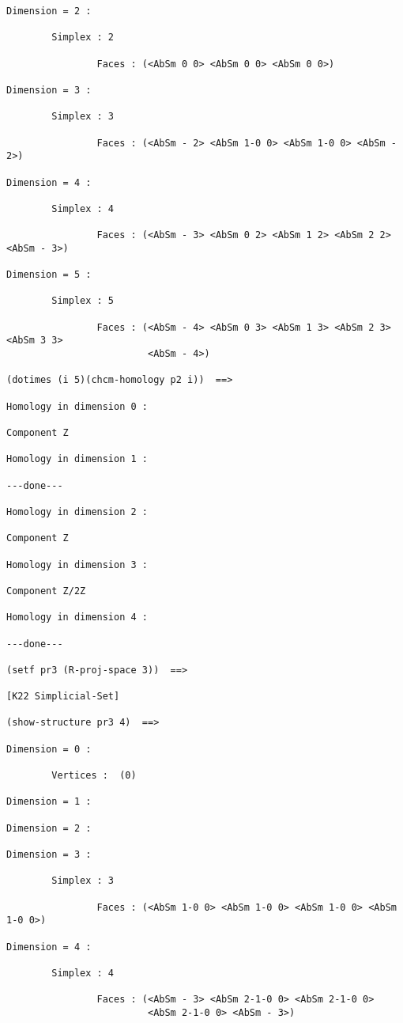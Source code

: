 {{\begin{verbatim}
Dimension = 2 :

        Simplex : 2

                Faces : (<AbSm 0 0> <AbSm 0 0> <AbSm 0 0>)

Dimension = 3 :

        Simplex : 3

                Faces : (<AbSm - 2> <AbSm 1-0 0> <AbSm 1-0 0> <AbSm - 2>)

Dimension = 4 :

        Simplex : 4

                Faces : (<AbSm - 3> <AbSm 0 2> <AbSm 1 2> <AbSm 2 2> <AbSm - 3>)

Dimension = 5 :

        Simplex : 5

                Faces : (<AbSm - 4> <AbSm 0 3> <AbSm 1 3> <AbSm 2 3> <AbSm 3 3> 
                         <AbSm - 4>)

(dotimes (i 5)(chcm-homology p2 i))  ==>

Homology in dimension 0 :

Component Z

Homology in dimension 1 :

---done---

Homology in dimension 2 :

Component Z

Homology in dimension 3 :

Component Z/2Z

Homology in dimension 4 :

---done---

(setf pr3 (R-proj-space 3))  ==>

[K22 Simplicial-Set]

(show-structure pr3 4)  ==>

Dimension = 0 :

        Vertices :  (0)

Dimension = 1 :

Dimension = 2 :

Dimension = 3 :

        Simplex : 3

                Faces : (<AbSm 1-0 0> <AbSm 1-0 0> <AbSm 1-0 0> <AbSm 1-0 0>)

Dimension = 4 :

        Simplex : 4

                Faces : (<AbSm - 3> <AbSm 2-1-0 0> <AbSm 2-1-0 0> 
                         <AbSm 2-1-0 0> <AbSm - 3>)


\end{verbatim}}}
